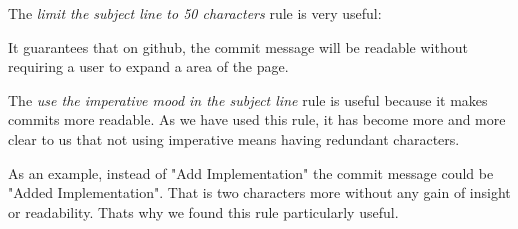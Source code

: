 The \emph{limit the subject line to 50 characters} rule is very useful:

It guarantees that on github, the commit message will be readable without requiring a user to expand a area of the page.

The \emph{use the imperative mood in the subject line} rule is useful because it makes commits more readable. As we have used this rule, it has become more and more clear to us that not using imperative means having redundant characters.

As an example, instead of "Add Implementation" the commit message could be "Added Implementation". That is two characters more without any gain of insight or readability. Thats why we found this rule particularly useful.
